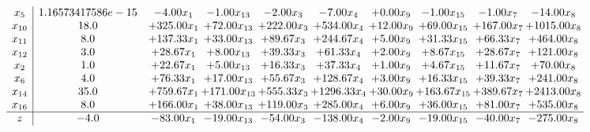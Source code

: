 \documentclass[9pt]{article}
\begin{document}
\[\begin{array}{c| c c@{\hskip 2pt} c@{\hskip 2pt} c@{\hskip 2pt} c@{\hskip 2pt} c@{\hskip 2pt} c@{\hskip 2pt} c@{\hskip 2pt} c@{\hskip 2pt} }
 x_{5}   &  1.16573417586e-15 & -4.00 x_{1} & -1.00 x_{13} & -2.00 x_{3} & -7.00 x_{4} & +  0.00 x_{9} & -1.00 x_{15} & -1.00 x_{7} & -14.00 x_{8}\\
 x_{10}   &  18.0 & + 325.00 x_{1} & + 72.00 x_{13} & + 222.00 x_{3} & + 534.00 x_{4} & + 12.00 x_{9} & + 69.00 x_{15} & + 167.00 x_{7} & + 1015.00 x_{8}\\
 x_{11}   &  8.0 & + 137.33 x_{1} & + 33.00 x_{13} & + 89.67 x_{3} & + 244.67 x_{4} & +  5.00 x_{9} & + 31.33 x_{15} & + 66.33 x_{7} & + 464.00 x_{8}\\
 x_{12}   &  3.0 & + 28.67 x_{1} & +  8.00 x_{13} & + 39.33 x_{3} & + 61.33 x_{4} & +  2.00 x_{9} & +  8.67 x_{15} & + 28.67 x_{7} & + 121.00 x_{8}\\
 x_{2}   &  1.0 & + 22.67 x_{1} & +  5.00 x_{13} & + 16.33 x_{3} & + 37.33 x_{4} & +  1.00 x_{9} & +  4.67 x_{15} & + 11.67 x_{7} & + 70.00 x_{8}\\
 x_{6}   &  4.0 & + 76.33 x_{1} & + 17.00 x_{13} & + 55.67 x_{3} & + 128.67 x_{4} & +  3.00 x_{9} & + 16.33 x_{15} & + 39.33 x_{7} & + 241.00 x_{8}\\
 x_{14}   &  35.0 & + 759.67 x_{1} & + 171.00 x_{13} & + 555.33 x_{3} & + 1296.33 x_{4} & + 30.00 x_{9} & + 163.67 x_{15} & + 389.67 x_{7} & + 2413.00 x_{8}\\
 x_{16}   &  8.0 & + 166.00 x_{1} & + 38.00 x_{13} & + 119.00 x_{3} & + 285.00 x_{4} & +  6.00 x_{9} & + 36.00 x_{15} & + 81.00 x_{7} & + 535.00 x_{8}\\
\hline
z    &  -4.0 & -83.00 x_{1} & -19.00 x_{13} & -54.00 x_{3} & -138.00 x_{4} & -2.00 x_{9} & -19.00 x_{15} & -40.00 x_{7} & -275.00 x_{8}\\
\end{array}\]
\end{document}
